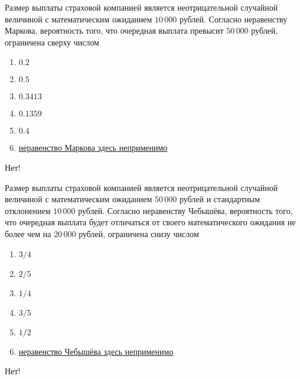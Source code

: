 \documentclass[t]{beamer}
\begin{document}
 \begin{frame} \label{19-No} 
\begin{block}{19} 

Размер выплаты страховой компанией является неотрицательной случайной величиной с математическим ожиданием $10\,000$ рублей. Согласно неравенству Маркова, вероятность того, что очередная выплата превысит $50\,000$ рублей, ограничена сверху числом
  


 \end{block} 
\begin{enumerate} 
\item[] \hyperlink{19-Yes}{\beamergotobutton{} $0.2$}
\item[] \hyperlink{19-No}{\beamergotobutton{} $0.5$}
\item[] \hyperlink{19-No}{\beamergotobutton{} $0.3413$}
\item[] \hyperlink{19-No}{\beamergotobutton{} $0.1359$}
\item[] \hyperlink{19-No}{\beamergotobutton{} $0.4$}
\item[] \hyperlink{19-No}{\beamergotobutton{} неравенство Маркова здесь неприменимо}
\end{enumerate} 

 \alert{Нет!} 
\end{frame} 


 \begin{frame} \label{20-No} 
\begin{block}{20} 

  Размер выплаты страховой компанией является неотрицательной случайной величиной с математическим ожиданием $50\,000$ рублей и стандартным отклонением $10\,000$ рублей. Согласно неравенству Чебышёва, вероятность того, что очередная выплата будет отличаться от своего математического ожидания не более чем на 20\,000 рублей, ограничена снизу числом
  


 \end{block} 
\begin{enumerate} 
\item[] \hyperlink{20-Yes}{\beamergotobutton{} $3/4$}
\item[] \hyperlink{20-No}{\beamergotobutton{} $2/5$}
\item[] \hyperlink{20-No}{\beamergotobutton{} $1/4$}
\item[] \hyperlink{20-No}{\beamergotobutton{} $3/5$}
\item[] \hyperlink{20-No}{\beamergotobutton{} $1/2$}
\item[] \hyperlink{20-No}{\beamergotobutton{} неравенство Чебышёва здесь неприменимо}
\end{enumerate} 

 \alert{Нет!} 
\end{frame} 
\end{document}
